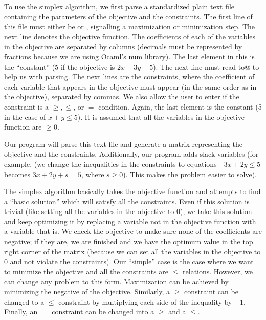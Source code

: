 \documentclass[letterpaper,12pt]{article}
\begin{document}
To use the simplex algorithm, we first parse a standardized plain text file
containing the parameters of the objective and the constraints. The first line
of this file must either be \verb@max@ or \verb@min@, signalling a maximization
or minimization step. The next line denotes the objective function. The
coefficients of each of the variables in the objective are separated by columns
(decimals must be represented by fractions because we are using Ocaml's num
library). The last element in this is the ``constant'' (5 if the objective is
$2x + 3y + 5$). The next line must read \verb@subject to@ to help us with
parsing. The next lines are the constraints, where the coefficient of each
variable that appears in the objective must appear (in the same order as in the
objective), separated by commas. We also allow the user to enter if the
constraint is a $\geq, \leq$, or $=$ condition. Again, the last element is the
constant (5 in the case of $x + y \leq 5$). It is assumed that all the variables
in the objective function are $\geq 0$. 

Our program will parse this text file and generate a matrix representing the
objective and the constraints. Additionally, our program adds slack variables
(for example, (we change the inequalities in the constraints to equations---$3x
+ 2y \leq 5$ becomes $3x + 2y + s = 5$, where $s \geq 0$). This makes the
problem easier to solve). 

The simplex algorithm basically takes the objective function and attempts to
find a ``basic solution'' which will satisfy all the constraints. Even if this
solution is trivial (like setting all the variables in the objective to 0), we
take this solution and keep optimizing it by replacing a variable not in the
objective function with a variable that is. We check the objective to make sure
none of the coefficients are negative; if they are, we are finished and we have
the optimum value in the top right corner of the matrix (because we can set all
the variables in the objective to 0 and not violate the constraints). Our
``simple'' case is the case where we want to minimize the objective and all the
constraints are $\leq$ relations. However, we can change any problem to this
form. Maximization can be achieved by minimizing the negative of the objective.
Similarly, a $\geq$ constraint can be changed to a $\leq$ constraint by
multiplying each side of the inequality by $-1$. Finally, an $=$ constraint can
be changed into a $\geq$ and a $\leq$.
\end{document}
